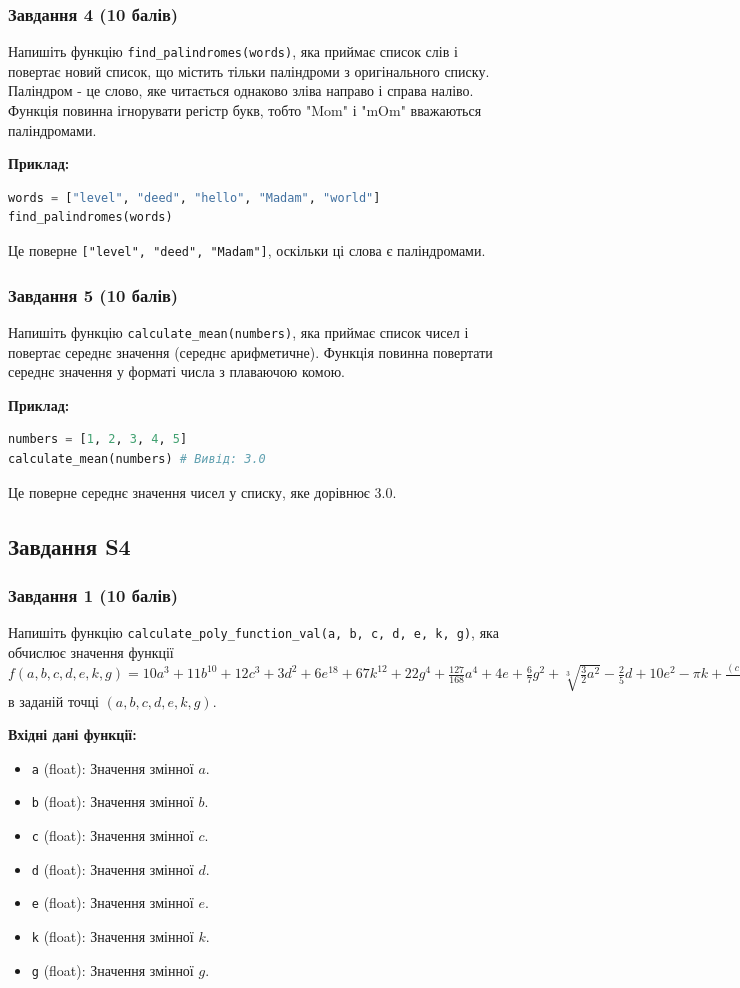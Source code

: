 \documentclass[12pt]{article}
\begin{document}
\subsubsection{Завдання 4 (10 балів)}
Напишіть функцію \texttt{find\_palindromes(words)}, яка приймає список слів і повертає новий список, що містить тільки паліндроми з оригінального списку. Паліндром - це слово, яке читається однаково зліва направо і справа наліво. Функція повинна ігнорувати регістр букв, тобто "Mom" і "mOm" вважаються паліндромами.

\textbf{Приклад:}
\begin{lstlisting}[language=Python]
words = ["level", "deed", "hello", "Madam", "world"]
find_palindromes(words)
\end{lstlisting}
Це поверне \texttt{["level", "deed", "Madam"]}, оскільки ці слова є паліндромами.

\subsubsection{Завдання 5 (10 балів)}
Напишіть функцію \texttt{calculate\_mean(numbers)}, яка приймає список чисел і повертає середнє значення (середнє арифметичне). Функція повинна повертати середнє значення у форматі числа з плаваючою комою.

\textbf{Приклад:}
\begin{lstlisting}[language=Python]
numbers = [1, 2, 3, 4, 5]
calculate_mean(numbers) # Вивід: 3.0
\end{lstlisting}
Це поверне середнє значення чисел у списку, яке дорівнює 3.0.

\newpage

\subsection{Завдання S4}

\subsubsection{Завдання 1 (10 балів)}
Напишіть функцію \texttt{calculate\_poly\_function\_val(a, b, c, d, e, k, g)}, яка обчислює значення функції $f(a, b, c, d, e, k, g) = 10a^3 + 11b^{10} + 12c^3 + 3d^2 + 6e^{18} + 67k^{12} + 22g^4 + \frac{127}{168}a^4 + 4e + \frac{6}{7}g^2 + \sqrt[3]{\frac{3}{2}a^2} - \frac{2}{5}d + 10e^2 - \pi k + \frac{(c + d + k + g)a^2}{b}$ в заданій точці $(a, b, c, d, e, k, g)$.

\textbf{Вхідні дані функції:}
\begin{itemize}
\item \texttt{a} (float): Значення змінної $a$.
\item \texttt{b} (float): Значення змінної $b$.
\item \texttt{c} (float): Значення змінної $c$.
\item \texttt{d} (float): Значення змінної $d$.
\item \texttt{e} (float): Значення змінної $e$.
\item \texttt{k} (float): Значення змінної $k$.
\item \texttt{g} (float): Значення змінної $g$.
\end{itemize}
\end{document}
